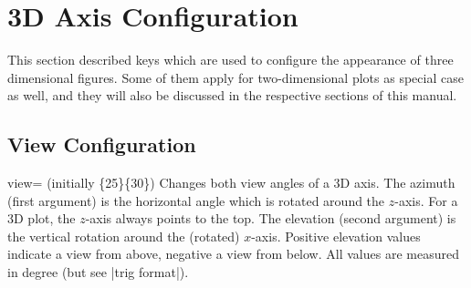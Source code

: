 
\section[reference.3dconfiguration]{3D Axis Configuration}
\label{sec:3d:axis:config}

{

This section described keys which are used to configure the appearance of three
dimensional figures. Some of them apply for two-dimensional plots as special
case as well, and they will also be discussed in the respective sections of
this manual.


\subsection{View Configuration}

\begin{pgfplotskey}{view= (initially \{25\}\{30\})}
%
%
    Changes both view angles of a 3D axis. The azimuth (first argument) is the
    horizontal angle which is rotated around the $z$-axis. For a 3D plot, the
    $z$-axis always points to the top. The elevation (second argument) is the
    vertical rotation around the (rotated) $x$-axis. Positive elevation values
    indicate a view from above, negative a view from below. All values are
    measured in degree (but see |trig format|).
\pgfplotsexpensiveexample
\begin{codeexample}[]
\end{codeexample}

\pgfplotsexpensiveexample
\begin{codeexample}[]
\end{codeexample}

\pgfplotsexpensiveexample
\begin{codeexample}[]
\end{codeexample}


\end{pgfplotskey}}
